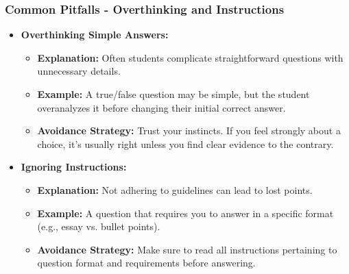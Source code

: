 \documentclass{beamer}
\begin{document}
\begin{frame}[fragile]
    \frametitle{Common Pitfalls - Overthinking and Instructions}
    \begin{itemize}
        \item \textbf{Overthinking Simple Answers:}
        \begin{itemize}
            \item \textbf{Explanation:} Often students complicate straightforward questions with unnecessary details.
            \item \textbf{Example:} A true/false question may be simple, but the student overanalyzes it before changing their initial correct answer.
            \item \textbf{Avoidance Strategy:} Trust your instincts. If you feel strongly about a choice, it's usually right unless you find clear evidence to the contrary.
        \end{itemize}

        \item \textbf{Ignoring Instructions:}
        \begin{itemize}
            \item \textbf{Explanation:} Not adhering to guidelines can lead to lost points.
            \item \textbf{Example:} A question that requires you to answer in a specific format (e.g., essay vs. bullet points).
            \item \textbf{Avoidance Strategy:} Make sure to read all instructions pertaining to question format and requirements before answering.
        \end{itemize}
    \end{itemize}
\end{frame}
\end{document}
